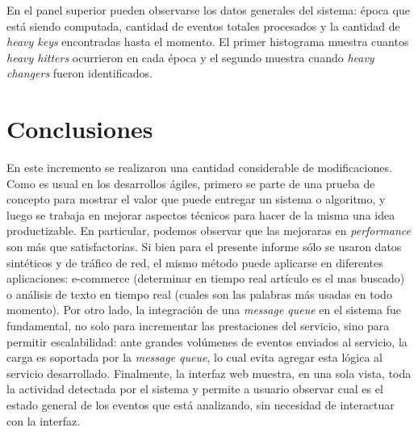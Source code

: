 \documentclass[a4paper,10pt, oneside]{article}
\begin{document}
En el panel superior pueden observarse los datos generales del sistema: época que está siendo computada, cantidad de eventos totales procesados y la cantidad de \textit{heavy keys} encontradas hasta el momento. El primer histograma muestra cuantos \textit{heavy hitters} ocurrieron en cada época y el segundo muestra cuando \textit{heavy changers} fueron identificados.

\section{Conclusiones}
En este incremento se realizaron una cantidad considerable de modificaciones. Como es usual en los desarrollos ágiles, primero se parte de una prueba de concepto para mostrar el valor que puede entregar un sistema o algoritmo, y luego se trabaja en mejorar aspectos técnicos para hacer de la misma una idea productizable.
En particular, podemos observar que las mejoraras en \textit{performance} son más que satisfactorias. Si bien para el presente informe sólo se usaron datos sintéticos y de tráfico de red, el mismo método puede aplicarse en diferentes aplicaciones: e-commerce (determinar en tiempo real artículo es el mas buscado) o análisis de texto en tiempo real (cuales son las palabras más usadas en todo momento).
Por otro lado, la integración de una \textit{message queue} en el sistema fue fundamental, no solo para incrementar las prestaciones del servicio, sino para permitir escalabilidad: ante grandes volúmenes de eventos enviados al servicio, la carga es soportada por la \textit{message queue}, lo cual evita agregar esta lógica al servicio desarrollado.
Finalmente, la interfaz web muestra, en una sola vista, toda la actividad detectada por el sistema y permite a usuario observar cual es el estado general de los eventos que está analizando, sin necesidad de interactuar con la interfaz.
\newpage
\nocite{*}
\printbibliography
\end{document}

